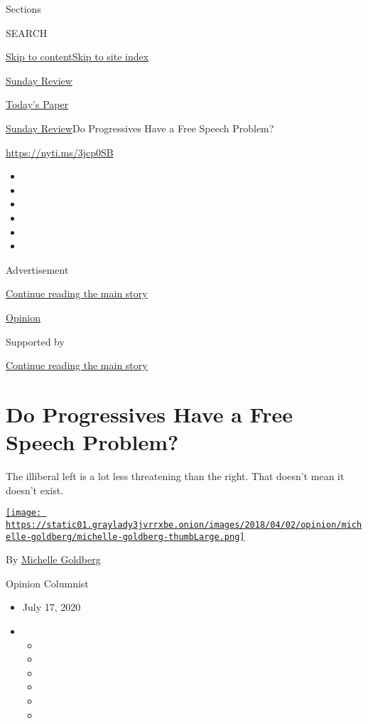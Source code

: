 Sections

SEARCH

\protect\hyperlink{site-content}{Skip to
content}\protect\hyperlink{site-index}{Skip to site index}

\href{https://www.nytimes3xbfgragh.onion/section/opinion/sunday}{Sunday
Review}

\href{https://myaccount.nytimes3xbfgragh.onion/auth/login?response_type=cookie\&client_id=vi}{}

\href{https://www.nytimes3xbfgragh.onion/section/todayspaper}{Today's
Paper}

\href{/section/opinion/sunday}{Sunday Review}\textbar{}Do Progressives
Have a Free Speech Problem?

\url{https://nyti.ms/3jcp0SB}

\begin{itemize}
\item
\item
\item
\item
\item
\item
\end{itemize}

Advertisement

\protect\hyperlink{after-top}{Continue reading the main story}

\href{/section/opinion}{Opinion}

Supported by

\protect\hyperlink{after-sponsor}{Continue reading the main story}

\hypertarget{do-progressives-have-a-free-speech-problem}{%
\section{Do Progressives Have a Free Speech
Problem?}\label{do-progressives-have-a-free-speech-problem}}

The illiberal left is a lot less threatening than the right. That
doesn't mean it doesn't exist.

\href{https://www.nytimes3xbfgragh.onion/by/michelle-goldberg}{\texttt{[image: https://static01.graylady3jvrrxbe.onion/images/2018/04/02/opinion/michelle-goldberg/michelle-goldberg-thumbLarge.png]}}

By
\href{https://www.nytimes3xbfgragh.onion/by/michelle-goldberg}{Michelle
Goldberg}

Opinion Columnist

\begin{itemize}
\item
  July 17, 2020
\item
  \begin{itemize}
  \item
  \item
  \item
  \item
  \item
  \item
  \end{itemize}
\end{itemize}

